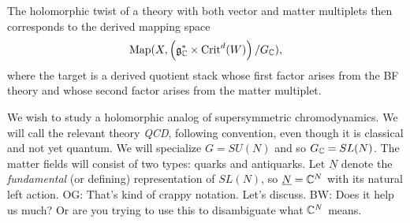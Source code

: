 \documentclass[11pt]{amsart}
\def\brian#1{{\textcolor{blue!75!red}{BW: {#1}}}}
\def\owen#1{{\textcolor{violet!50!black}{OG: {#1}}}}
\begin{document}
The holomorphic twist of a theory with both vector and matter multiplets then corresponds to the  derived mapping space
\[
{\rm Map}(X , \left( \mathfrak g_\mathbb C^*\times {\rm Crit}^d(W) \right)/ G_\mathbb C), 
\]
where the target is a derived quotient stack whose first factor arises from the BF theory and whose second factor arises from the matter multiplet.

We wish to study a holomorphic analog of supersymmetric chromodynamics.
We will call the relevant theory {\it QCD}, following convention, even though it is classical and not yet quantum.
We will specialize $G = SU(N)$ and so $G_\mathbb C = SL(N)$.
The matter fields will consist of two types: quarks and antiquarks.
Let $\underline{N}$ denote the {\em fundamental} (or defining) representation of $SL(N)$,
so $\underline{N} = \mathbb C^N$ with its natural left action.
\owen{That's kind of crappy notation. Let's discuss.}
\brian{Does it help us much? Or are you trying to use this to disambiguate what $\mathbb C^N$ means.}

\end{document}
